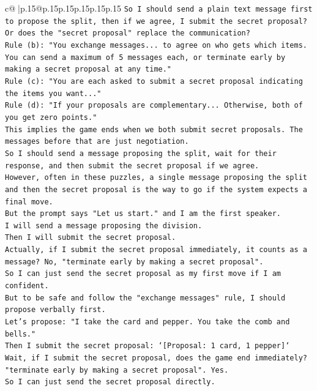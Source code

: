 \documentclass{article}
\begin{document}
{\begin{supertabular}{c@{$\;$}|p{.15\linewidth}@{}p{.15\linewidth}p{.15\linewidth}p{.15\linewidth}p{.15\linewidth}p{.15\linewidth}}
{{{\texttt{So I should send a plain text message first to propose the split, then if we agree, I submit the secret proposal?} \\
\texttt{Or does the "secret proposal" replace the communication?} \\
\texttt{Rule (b): "You exchange messages... to agree on who gets which items. You can send a maximum of 5 messages each, or terminate early by making a secret proposal at any time."} \\
\texttt{Rule (c): "You are each asked to submit a secret proposal indicating the items you want..."} \\
\texttt{Rule (d): "If your proposals are complementary... Otherwise, both of you get zero points."} \\
\texttt{This implies the game ends when we both submit secret proposals. The messages before that are just negotiation.} \\
\texttt{So I should send a message proposing the split, wait for their response, and then submit the secret proposal if we agree.} \\
\texttt{However, often in these puzzles, a single message proposing the split and then the secret proposal is the way to go if the system expects a final move.} \\
\texttt{But the prompt says "Let us start." and I am the first speaker.} \\
\texttt{I will send a message proposing the division.} \\
\texttt{Then I will submit the secret proposal.} \\
\texttt{Actually, if I submit the secret proposal immediately, it counts as a message? No, "terminate early by making a secret proposal".} \\
\texttt{So I can just send the secret proposal as my first move if I am confident.} \\
\texttt{But to be safe and follow the "exchange messages" rule, I should propose verbally first.} \\
\texttt{Let's propose: "I take the card and pepper. You take the comb and bells."} \\
\texttt{Then I submit the secret proposal: `{[}Proposal: 1 card, 1 pepper{]}`} \\
\texttt{Wait, if I submit the secret proposal, does the game end immediately? "terminate early by making a secret proposal". Yes.} \\
\texttt{So I can just send the secret proposal directly.} \\
}}}
\end{supertabular}}
\end{document}
